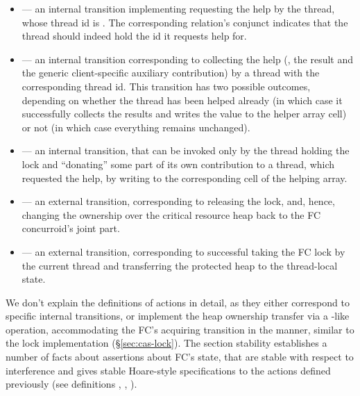 \begin{itemize}

\item {} --- an internal transition implementing
  requesting the help by the thread, whose thread id is
  . The corresponding relation's conjunct  indicates that the thread should
  indeed hold the id it requests help for.

\item {} --- an internal transition corresponding
  to collecting the help (\ie, the result and the generic
  client-specific auxiliary contribution) by a thread with the
  corresponding thread id.  This transition has two possible outcomes,
  depending on whether the thread has been helped already (in which
  case it successfully collects the results and writes the
   value to the helper array cell) or not (in which case
  everything remains unchanged).

\item {} --- an internal transition, that can be
  invoked only by the thread holding the lock and ``donating'' some
  part of its own contribution to a thread, which requested the help,
  by writing to the corresponding cell of the helping array.

\item {} --- an external transition, corresponding to
  releasing the lock, and, hence, changing the ownership over the
  critical resource heap back to the FC concurroid's joint part.

\item {} --- an external transition, corresponding to
  successful taking the FC lock by the current thread and transferring
  the protected heap to the thread-local state.

\end{itemize}

We don't explain the definitions of actions in detail, as they either
correspond to specific internal transitions, or implement the heap
ownership transfer via a -like operation, accommodating the
FC's acquiring transition in the manner, similar to the lock
implementation (\S\ref{sec:cas-lock}). The section 
stability establishes a number of facts about assertions about FC's
state, that are stable with respect to interference and gives stable
Hoare-style specifications to the actions defined previously (see
definitions , ,  \etc).

